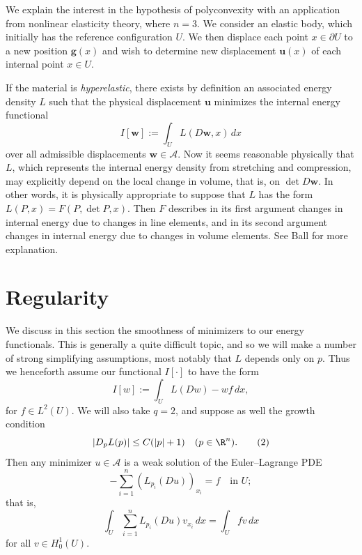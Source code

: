 \begin{example}
\label{ex:polyconvexity-nonlinear-elasticity}
We explain the interest in the hypothesis of polyconvexity with an application from nonlinear elasticity theory, where $n = 3$. We consider an elastic body, which initially has the reference configuration $U$. We then displace each point $x \in \partial U$ to a new position $\mathbf{g}(x)$ and wish to determine new displacement $\mathbf{u}(x)$ of each internal point $x \in U$.

If the material is \textit{hyperelastic}, there exists by definition an associated energy density $L$ such that the physical displacement $\mathbf{u}$ minimizes the internal energy functional
\[
I[\mathbf{w}] := \int_U L(D\mathbf{w}, x)\, dx
\]
over all admissible displacements $\mathbf{w} \in \mathcal{A}$. Now it seems reasonable physically that $L$, which represents the internal energy density from stretching and compression, may explicitly depend on the local change in volume, that is, on $\det D\mathbf{w}$. In other words, it is physically appropriate to suppose that $L$ has the form $L(P, x) = F(P, \det P, x)$. Then $F$ describes in its first argument changes in internal energy due to changes in line elements, and in its second argument changes in internal energy due to changes in volume elements. See Ball \cite{Ball1977} for more explanation.
\end{example}

\section{Regularity}
\label{sec:regularity-calculus-of-variations}

We discuss in this section the smoothness of minimizers to our energy functionals. This is generally a quite difficult topic, and so we will make a number of strong simplifying assumptions, most notably that $L$ depends only on $p$. Thus we henceforth assume our functional $I[\cdot]$ to have the form
\[
I[w] := \int_U L(Dw) - wf\, dx,
\tag{1}
\]
for $f \in L^2(U)$. We will also take $q = 2$, and suppose as well the growth condition
\[
|D_pL(p)| \le C(|p|+1) \quad (p \in \R^n).
\tag{2}
\]
Then any minimizer $u \in \mathcal{A}$ is a weak solution of the Euler--Lagrange PDE
\[
-\sum_{i=1}^n (L_{p_i}(Du))_{x_i} = f \quad \text{in } U;
\tag{3}
\]
that is,
\[
\int_U \sum_{i=1}^n L_{p_i}(Du) v_{x_i}\, dx = \int_U fv\, dx
\tag{4}
\]
for all $v \in H_0^1(U)$.

